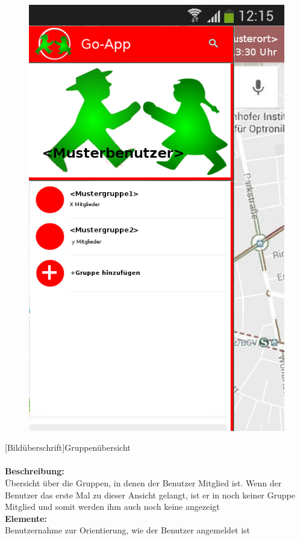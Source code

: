 \begin{figure}
	\includegraphics[scale =1]{resources/images/gruppenuebersicht.png}
\end{figure}
[Bildüberschrift]Gruppenübersicht\\ \\
\textbf{Beschreibung:}\\
Übersicht über die Gruppen, in denen der Benutzer Mitglied ist. Wenn der Benutzer das erste Mal zu dieser Ansicht gelangt, ist er in noch keiner Gruppe Mitglied und somit werden ihm auch noch keine angezeigt\\
\textbf{Elemente:}\\
Benutzernahme zur Orientierung, wie der Benutzer angemeldet ist\\
